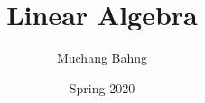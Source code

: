 \documentclass{article}
\begin{document}
\title{Linear Algebra}
\author{Muchang Bahng}
\date{Spring 2020}

\maketitle
\tableofcontents
\pagebreak










\end{document}
